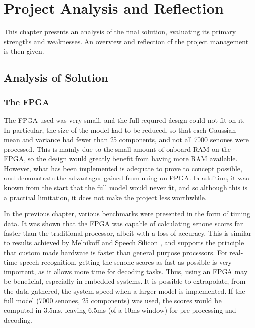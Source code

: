 \chapter{Project Analysis and Reflection} %
\label{cha:project_analysis}

This chapter presents an analysis of the final solution, evaluating its primary strengths and weaknesses.  An overview and reflection of the project management is then given.

\section{Analysis of Solution} %
\label{sec:analysis_of_solution}

	\subsection{The FPGA} %
	\label{sub:analysis_the_fpga}
		The FPGA used was very small, and the full required design could not fit on it.  In particular, the size of the model had to be reduced, so that each Gaussian mean and variance had fewer than 25 components, and not all 7000 senones were processed.  This is mainly due to the small amount of onboard RAM on the FPGA, so the design would greatly benefit from having more RAM available.  However, what has been implemented is adequate to prove to concept possible, and demonstrate the advantages gained from using an FPGA.  In addition, it was known from the start that the full model would never fit, and so although this is a practical limitation, it does not make the project less worthwhile.

		In the previous chapter, various benchmarks were presented in the form of timing data.  It was shown that the FPGA was capable of calculating senone scores far faster than the traditional processor, albeit with a loss of accuracy.  This is similar to results achieved by Melnikoff \cite{melnikoff2003speech} and Speech Silicon \cite{schuster2006speech}, and supports the principle that custom made hardware is faster than general purpose processors.  For real-time speech recognition, getting the senone scores as fast as possible is very important, as it allows more time for decoding tasks.  Thus, using an FPGA may be beneficial, especially in embedded systems.  It is possible to extrapolate, from the data gathered, the system speed when a larger model is implemented.  If the full model (7000 senones, 25 components) was used, the scores would be computed in 3.5ms, leaving 6.5ms (of a 10ms window) for pre-processing and decoding.

